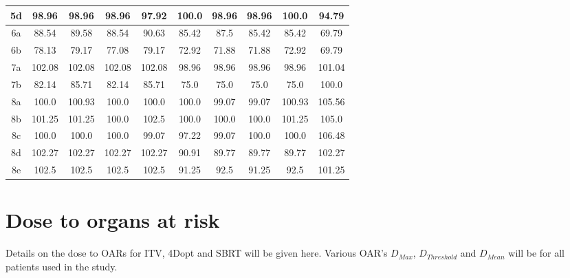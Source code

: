 \begin{table}[H]
\begin{tabular}{|c|c|c|c|c|c|c|c|c|c|}
 5d & 98.96 & 98.96 & 98.96 & 97.92 & 100.0 & 98.96 & 98.96 & 100.0 & 94.79 \\ 
  \hline 
6a & 88.54 & 89.58 & 88.54 & 90.63 & 85.42 & 87.5 & 85.42 & 85.42 & 69.79 \\ 
 6b & 78.13 & 79.17 & 77.08 & 79.17 & 72.92 & 71.88 & 71.88 & 72.92 & 69.79 \\ 
  \hline 
7a & 102.08 & 102.08 & 102.08 & 102.08 & 98.96 & 98.96 & 98.96 & 98.96 & 101.04 \\ 
 7b & 82.14 & 85.71 & 82.14 & 85.71 & 75.0 & 75.0 & 75.0 & 75.0 & 100.0 \\ 
  \hline 
8a & 100.0 & 100.93 & 100.0 & 100.0 & 100.0 & 99.07 & 99.07 & 100.93 & 105.56 \\ 
 8b & 101.25 & 101.25 & 100.0 & 102.5 & 100.0 & 100.0 & 100.0 & 101.25 & 105.0 \\ 
 8c & 100.0 & 100.0 & 100.0 & 99.07 & 97.22 & 99.07 & 100.0 & 100.0 & 106.48 \\ 
 8d & 102.27 & 102.27 & 102.27 & 102.27 & 90.91 & 89.77 & 89.77 & 89.77 & 102.27 \\ 
 8e & 102.5 & 102.5 & 102.5 & 102.5 & 91.25 & 92.5 & 91.25 & 92.5 & 101.25 \\ 
  \hline 
  \hline 

  
  \end{tabular}
  \label{tab:ctvcomplex}
\end{table}


 \newpage
\section{Dose to organs at risk}

Details on the dose to OARs for ITV, 4Dopt and SBRT will be given here. Various OAR's $D_{Max}$, $D_{Threshold}$ and $D_{Mean}$ will be for all patients used in the study.

